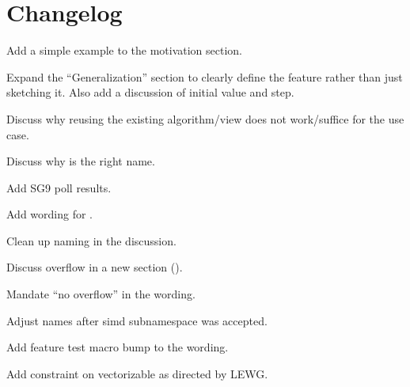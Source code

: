 \section{Changelog}
\begin{revision}
\item Add a simple example to the motivation section.
\item Expand the “Generalization” section to clearly define the feature rather
  than just sketching it.
  Also add a discussion of initial value and step.
\item Discuss why reusing the existing  algorithm/view does not
  work/suffice for the  use case.
\item Discuss why  is the right name.
\end{revision}

\begin{revision}
\item Add SG9 poll results.
\item Add wording for .
\end{revision}

\begin{revision}
\item Clean up naming in the discussion.
\item Discuss overflow in a new section ().
\item Mandate “no overflow” in the wording.
\end{revision}

\begin{revision}
\item Adjust names after simd subnamespace was accepted.
\item Add feature test macro bump to the wording.
\end{revision}

\begin{revision}
\item Add constraint on vectorizable as directed by LEWG.
\end{revision}
